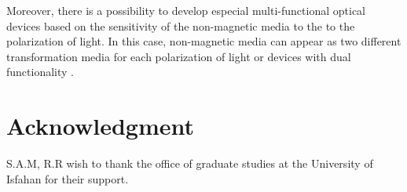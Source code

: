 \documentclass[9pt,twocolumn,twoside]{osajnl}
\begin{document}
Moreover, there is a possibility to develop especial multi-functional optical devices based on the sensitivity of the non-magnetic media to the to the polarization of light.  In this case, non-magnetic media can appear as two different transformation media for each polarization of light or devices with dual functionality \cite{}. 

\section*{Acknowledgment}
S.A.M, R.R wish to thank the office of graduate studies at the University of Isfahan for their support.


\end{document}
